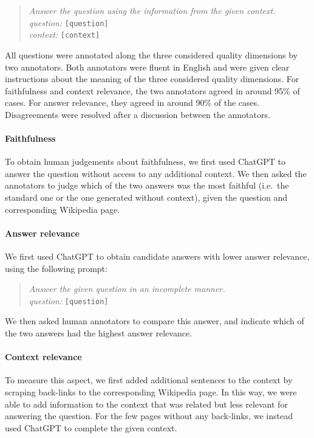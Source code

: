 \documentclass[11pt]{article}
\newcommand{\luis}[1]{\textcolor{olive}{#1}}
\begin{document}
\begin{quote}
\textit{Answer the question using the information from the given context.\\ 
question:} \texttt{[question]}\\
\textit{context:} \texttt{[context]}
\end{quote} 
All questions were annotated along the three considered quality dimensions by two annotators. Both annotators were fluent in English and were given clear instructions about the meaning of the three considered quality dimensions. For faithfulness and context relevance, the two annotators agreed in around 95\% of cases. For answer relevance, they agreed in around 90\% of the cases. Disagreements were resolved after a discussion between the annotators. %

\paragraph{Faithfulness} To obtain human judgements about faithfulness, we first used ChatGPT to answer the question without access to any additional context. We then asked the annotators to judge which of the two answers was the most faithful (i.e.\ the standard one or the one generated without context), given the question and corresponding Wikipedia page.

\paragraph{Answer relevance}  We first used ChatGPT to obtain candidate answers with lower answer relevance, using the following prompt:
\begin{quote}
\textit{Answer the given question in an incomplete manner.\\
question:} \texttt{[question]}
\end{quote}
We then asked human annotators to compare this answer, and indicate which of the two answers had the highest answer relevance.

\paragraph{Context relevance} To measure this aspect, we first added additional sentences to the context by scraping back-links to the corresponding Wikipedia page. In this way, we were able to add information to the context that was related but less relevant for answering the question. For the few pages without any back-links, we instead used ChatGPT to complete the given context. 
\end{document}
